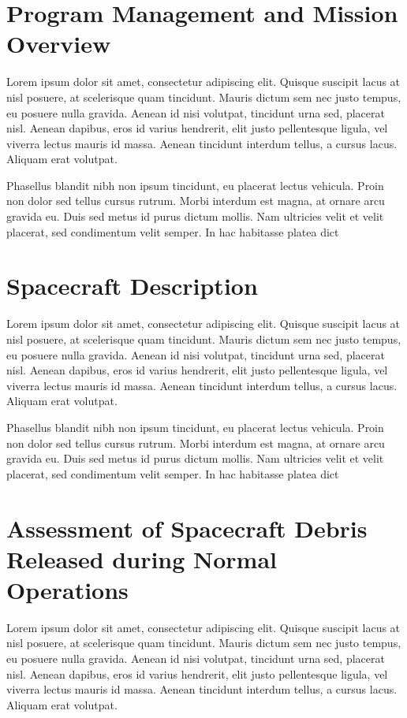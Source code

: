 \documentclass{article}
\begin{document}


\tableofcontents


\section{Program Management and Mission Overview}
Lorem ipsum dolor sit amet, consectetur adipiscing elit. Quisque suscipit lacus at nisl posuere, at scelerisque quam tincidunt. Mauris dictum sem nec justo tempus, eu posuere nulla gravida. Aenean id nisi volutpat, tincidunt urna sed, placerat nisl. Aenean dapibus, eros id varius hendrerit, elit justo pellentesque ligula, vel viverra lectus mauris id massa. Aenean tincidunt interdum tellus, a cursus lacus. Aliquam erat volutpat.

Phasellus blandit nibh non ipsum tincidunt, eu placerat lectus vehicula. Proin non dolor sed tellus cursus rutrum. Morbi interdum est magna, at ornare arcu gravida eu. Duis sed metus id purus dictum mollis. Nam ultricies velit et velit placerat, sed condimentum velit semper. In hac habitasse platea dict


\section{Spacecraft Description}
Lorem ipsum dolor sit amet, consectetur adipiscing elit. Quisque suscipit lacus at nisl posuere, at scelerisque quam tincidunt. Mauris dictum sem nec justo tempus, eu posuere nulla gravida. Aenean id nisi volutpat, tincidunt urna sed, placerat nisl. Aenean dapibus, eros id varius hendrerit, elit justo pellentesque ligula, vel viverra lectus mauris id massa. Aenean tincidunt interdum tellus, a cursus lacus. Aliquam erat volutpat.

Phasellus blandit nibh non ipsum tincidunt, eu placerat lectus vehicula. Proin non dolor sed tellus cursus rutrum. Morbi interdum est magna, at ornare arcu gravida eu. Duis sed metus id purus dictum mollis. Nam ultricies velit et velit placerat, sed condimentum velit semper. In hac habitasse platea dict


\section{Assessment of Spacecraft Debris Released during Normal Operations}
Lorem ipsum dolor sit amet, consectetur adipiscing elit. Quisque suscipit lacus at nisl posuere, at scelerisque quam tincidunt. Mauris dictum sem nec justo tempus, eu posuere nulla gravida. Aenean id nisi volutpat, tincidunt urna sed, placerat nisl. Aenean dapibus, eros id varius hendrerit, elit justo pellentesque ligula, vel viverra lectus mauris id massa. Aenean tincidunt interdum tellus, a cursus lacus. Aliquam erat volutpat.
\end{document}
